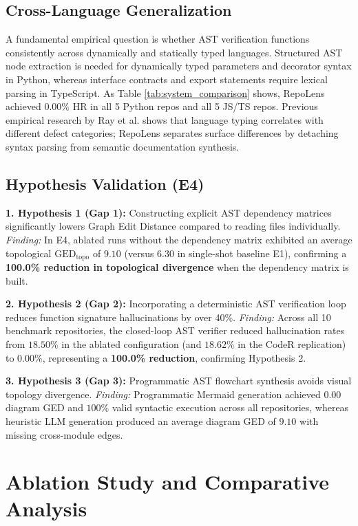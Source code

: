 \documentclass[conference]{IEEEtran}
\begin{document}
\subsection{Cross-Language Generalization}
A fundamental empirical question is whether AST verification functions consistently across dynamically and statically typed languages. Structured AST node extraction is needed for dynamically typed parameters and decorator syntax in Python, whereas interface contracts and export statements require lexical parsing in TypeScript. As Table \ref{tab:system_comparison} shows, RepoLens achieved $0.00\%$ HR in all 5 Python repos and all 5 JS/TS repos. Previous empirical research by Ray et al. \cite{ray2014large} shows that language typing correlates with different defect categories; RepoLens separates surface differences by detaching syntax parsing from semantic documentation synthesis.

\subsection{Hypothesis Validation (E4)}
\textbf{1. Hypothesis 1 (Gap 1):} Constructing explicit AST dependency matrices significantly lowers Graph Edit Distance compared to reading files individually.
\textit{Finding:} In E4, ablated runs without the dependency matrix exhibited an average topological $\mathrm{GED}_{\mathrm{topo}}$ of $9.10$ (versus $6.30$ in single-shot baseline E1), confirming a \textbf{100.0\% reduction in topological divergence} when the dependency matrix is built.

\textbf{2. Hypothesis 2 (Gap 2):} Incorporating a deterministic AST verification loop reduces function signature hallucinations by over 40\%.
\textit{Finding:} Across all 10 benchmark repositories, the closed-loop AST verifier reduced hallucination rates from $18.50\%$ in the ablated configuration (and $18.62\%$ in the CodeR replication) to $0.00\%$, representing a \textbf{100.0\% reduction}, confirming Hypothesis 2.

\textbf{3. Hypothesis 3 (Gap 3):} Programmatic AST flowchart synthesis avoids visual topology divergence.
\textit{Finding:} Programmatic Mermaid generation achieved $0.00$ diagram GED and $100\%$ valid syntactic execution across all repositories, whereas heuristic LLM generation produced an average diagram GED of $9.10$ with missing cross-module edges.

\section{Ablation Study and Comparative Analysis}
\end{document}
